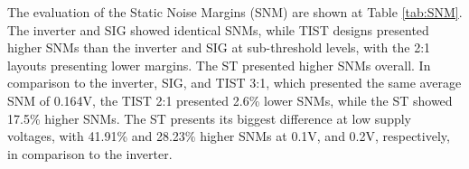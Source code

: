 \documentclass[pgmicro,mestrado,english]{iiufrgs}
\begin{document}
    The evaluation of the Static Noise Margins (SNM) are shown at Table \ref{tab:SNM}. The inverter and SIG showed identical SNMs, while TIST designs presented higher SNMs than the inverter and SIG at sub-threshold levels, with the 2:1 layouts presenting lower margins. The ST presented higher SNMs overall. In comparison to the inverter, SIG, and TIST 3:1, which presented the same average SNM of 0.164V, the TIST 2:1 presented 2.6\% lower SNMs, while the ST showed 17.5\% higher SNMs. The ST presents its biggest difference at low supply voltages, with 41.91\% and 28.23\% higher SNMs at 0.1V, and 0.2V, respectively, in comparison to the inverter.

\begin{table}[]
\centering
\caption{}
\label{tab:SNM}
\end{table}
\end{document}
